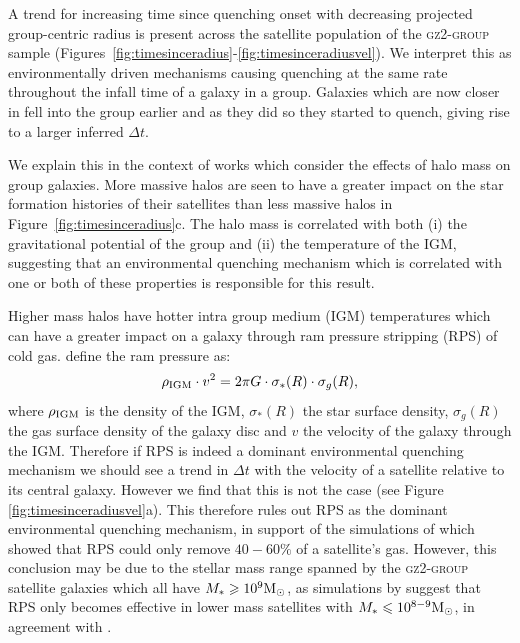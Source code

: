 \documentclass[useAMS,usenatbib]{mn2e}
\begin{document}
A trend for increasing time since quenching onset with decreasing projected group-centric radius is present across the satellite population of the \textsc{gz2-group} sample (Figures~\ref{fig:timesinceradius}-\ref{fig:timesinceradiusvel}). We interpret this as environmentally driven mechanisms causing quenching at the same rate throughout the infall time of a galaxy in a group. Galaxies which are now closer in fell into the group earlier and as they did so they started to quench, giving rise to a larger inferred $\Delta t$.

We explain this in the context of works which consider the effects of halo mass on group galaxies. More massive halos are seen to have a greater impact on the star formation histories of their satellites than less massive halos in Figure~\ref{fig:timesinceradius}c. The halo mass is correlated with both (i) the gravitational potential of the group and (ii) the temperature of the IGM, suggesting that an environmental quenching mechanism which is correlated with one or both of these properties is responsible for this result.

Higher mass halos have hotter intra group medium (IGM) temperatures \citep{shimizu03, delpopolo05} which can have a greater impact on a galaxy through ram pressure stripping (RPS) of cold gas. \cite{gunngott72} define the ram pressure as:
\begin{equation}\label{eq:rps}
\rho_{\rm{IGM}}\cdot v^2 = 2\pi G \cdot \sigma_*(R) \cdot \sigma_g(R),
\end{equation}
where $\rho_{\rm{IGM}}$ is the density of the IGM, $\sigma_*(R)$ the star surface density, $\sigma_g(R)$ the gas surface density of the galaxy disc and $v$ the velocity of the galaxy through the IGM. Therefore if RPS is indeed a dominant environmental quenching mechanism we should see a trend in $\Delta t$ with the velocity of a satellite relative to its central galaxy.  However we find that this is not the case (see Figure \ref{fig:timesinceradiusvel}a). This therefore rules out RPS as the dominant environmental quenching mechanism, in support of the simulations of \citet{emerick16, fillingham16} which showed that RPS could only remove $40-60\%$ of a satellite's gas. However, this conclusion may be due to the stellar mass range spanned by the \textsc{gz2-group} satellite galaxies which all have $M_* \geq 10^9 \rm{M}_{\odot}$, as simulations by \cite{fillingham16} suggest that RPS only becomes effective in lower mass satellites with $M_* \leq 10^{8-9} \rm{M}_{\odot}$, in agreement with \cite{hester06}. 
\end{document}
